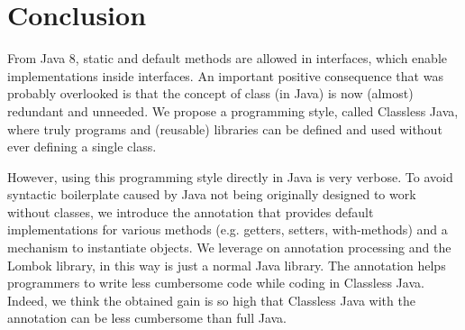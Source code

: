 \vspace{-5pt}
\section{Conclusion}\label{sec:conclusion}
From Java 8, static and default methods are allowed in interfaces, 
which enable implementations inside interfaces. An important positive consequence that
was probably overlooked is that the concept of class
(in Java) is now (almost) redundant and unneeded.
We propose a programming style, called Classless Java, where
truly \objectoriented programs and (reusable) libraries
can be defined and used without ever defining a single class.

However, using this programming style directly in Java is very verbose.
To avoid syntactic boilerplate
caused by Java not being originally designed to work without classes,
we introduce the \mixin annotation that provides default implementations
for various methods (e.g. getters, setters, with-methods) and a
mechanism to instantiate objects.
We leverage on annotation processing and the Lombok library, in this way
\mixin is just a normal Java library.
The \mixin annotation helps programmers
to write less cumbersome code while coding in Classless Java. Indeed,
we think the obtained gain is so high that Classless Java with the \mixin
annotation can be less cumbersome than full Java.

\begin{comment}
Classless Java is just a programming style, but showing the way
to a new flavor of OOP: we propose \interfacebased
\objectoriented languages (IB), as opposed to \classbased or
\prototypebased. In IB state is not modeled at the platonic
level but handled exclusively by instances.  This unlocks useful
code reuse patterns, as shown in Section~\ref{sec:ep}.
An interesting avenue for future work would be to design a new
language based on IB. With a proper language design, IB would not be restricted 
by limitations of Java and its syntax.
\end{comment}


